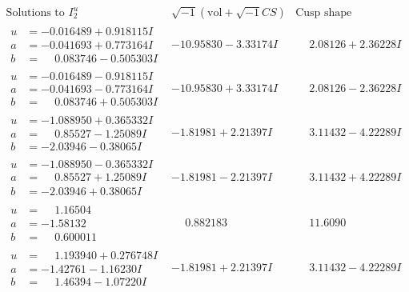 \documentclass[1p]{elsarticle_modified}
\theoremstyle{definition}
\newcommand{\I}{\sqrt{-1}}
\begin{document}
$$\begin{array}{c|c|c}  
\text{Solutions to }I^u_{2}& \I (\text{vol} + \sqrt{-1}CS) & \text{Cusp shape}\\
 \hline 
\begin{aligned}
u &= -0.016489 + 0.918115 I \\
a &= -0.041693 + 0.773164 I \\
b &= \phantom{-}0.083746 - 0.505303 I\end{aligned}
 & -10.95830 - 3.33174 I & \phantom{-}2.08126 + 2.36228 I \\ \hline\begin{aligned}
u &= -0.016489 - 0.918115 I \\
a &= -0.041693 - 0.773164 I \\
b &= \phantom{-}0.083746 + 0.505303 I\end{aligned}
 & -10.95830 + 3.33174 I & \phantom{-}2.08126 - 2.36228 I \\ \hline\begin{aligned}
u &= -1.088950 + 0.365332 I \\
a &= \phantom{-}0.85527 - 1.25089 I \\
b &= -2.03946 - 0.38065 I\end{aligned}
 & -1.81981 + 2.21397 I & \phantom{-}3.11432 - 4.22289 I \\ \hline\begin{aligned}
u &= -1.088950 - 0.365332 I \\
a &= \phantom{-}0.85527 + 1.25089 I \\
b &= -2.03946 + 0.38065 I\end{aligned}
 & -1.81981 - 2.21397 I & \phantom{-}3.11432 + 4.22289 I \\ \hline\begin{aligned}
u &= \phantom{-}1.16504\phantom{ +0.000000I} \\
a &= -1.58132\phantom{ +0.000000I} \\
b &= \phantom{-}0.600011\phantom{ +0.000000I}\end{aligned}
 & \phantom{-}0.882183\phantom{ +0.000000I} & \phantom{-}11.6090\phantom{ +0.000000I} \\ \hline\begin{aligned}
u &= \phantom{-}1.193940 + 0.276748 I \\
a &= -1.42761 - 1.16230 I \\
b &= \phantom{-}1.46394 - 1.07220 I\end{aligned}
 & -1.81981 + 2.21397 I & \phantom{-}3.11432 - 4.22289 I \\ \hline\begin{aligned}

\end{aligned}
\end{array}$$
\end{document}
